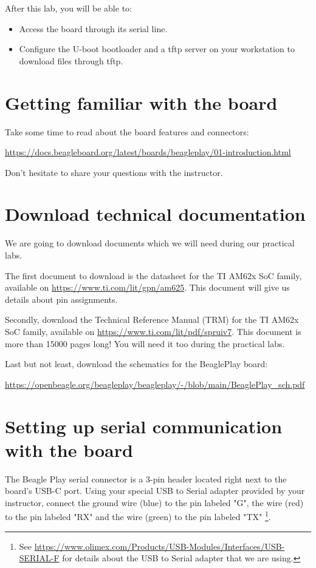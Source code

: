 
After this lab, you will be able to:
\begin{itemize}
\item Access the board through its serial line.
\item Configure the U-boot bootloader and a tftp server
      on your workstation to download files through tftp.
\end{itemize}

\section{Getting familiar with the board}

Take some time to read about the board features and connectors:

\url{https://docs.beagleboard.org/latest/boards/beagleplay/01-introduction.html}

Don't hesitate to share your questions with the instructor.

\section{Download technical documentation}

We are going to download documents which we will need during our
practical labs.

The first document to download is the datasheet for the
TI AM62x SoC family, available on
\url{https://www.ti.com/lit/gpn/am625}. This document will
give us details about pin assignments.

Secondly, download the Technical Reference Manual (TRM) for
the TI AM62x SoC family, available on
\url{https://www.ti.com/lit/pdf/spruiv7}.
This document is more than 15000 pages long! You will need it
too during the practical labs.

Last but not least, download the schematics for the BeaglePlay board:

\url{https://openbeagle.org/beagleplay/beagleplay/-/blob/main/BeaglePlay_sch.pdf}

\section{Setting up serial communication with the board}

The Beagle Play serial connector is a 3-pin header located right next to the
board's USB-C port. Using your special USB to Serial adapter provided  by your
instructor, connect the ground wire (blue) to the pin labeled "G", the
 wire (red) to the pin labeled "RX" and the  wire (green) to
the pin labeled "TX" \footnote{See \url{https://www.olimex.com/Products/USB-Modules/Interfaces/USB-SERIAL-F}
for details about the USB to Serial adapter that we are using.}.

